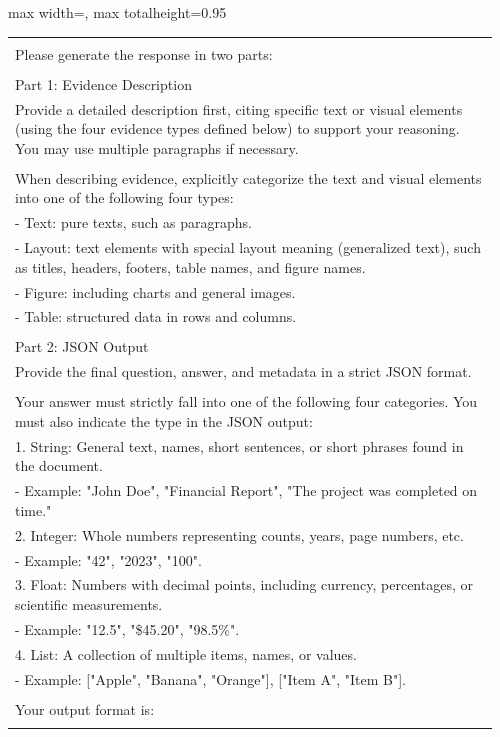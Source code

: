 {{\begin{table}[H]
\begin{adjustbox}{max width=\textwidth, max totalheight=0.95\textheight}
\begin{tabular}{p{0.96\linewidth}}
\begin{minipage}{0.96\linewidth}
 {[}Response Format{]}\\
 Please generate the response in two parts: \\
 \quad \\
 Part 1: Evidence Description \\
 Provide a detailed description first, citing specific text or visual elements (using the four evidence types defined below) to support your reasoning. You may use multiple paragraphs if necessary.\\
 \quad \\
 When describing evidence, explicitly categorize the text and visual elements into one of the following four types: \\
 - Text: pure texts, such as paragraphs. \\
 - Layout: text elements with special layout meaning (generalized text), such as titles, headers, footers, table names, and figure names. \\
 - Figure: including charts and general images. \\
 - Table: structured data in rows and columns. \\
 \quad \\
 Part 2: JSON Output \\
 Provide the final question, answer, and metadata in a strict JSON format.\\[2pt]
 \quad \\
 Your answer must strictly fall into one of the following four categories. You must also indicate the type in the JSON output: \\
 1. String: General text, names, short sentences, or short phrases found in the document. \\
 - Example: "John Doe", "Financial Report", "The project was completed on time." \\
 2. Integer: Whole numbers representing counts, years, page numbers, etc. \\
 - Example: "42", "2023", "100". \\
 3. Float: Numbers with decimal points, including currency, percentages, or scientific measurements. \\
 - Example: "12.5", "\$45.20", "98.5\%". \\
 4. List: A collection of multiple items, names, or values. \\
 - Example: ["Apple", "Banana", "Orange"], ["Item A", "Item B"]. \\
 \quad \\
 Your output format is:\\

\end{minipage}
\end{tabular}
\end{adjustbox}
\end{table}}}

